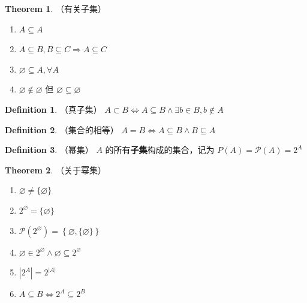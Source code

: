 \documentclass[oneside]{book}
\theoremstyle{definition}
\newtheorem{definition}{Definition}[section]
\newtheorem{theorem}{Theorem}[section]
\begin{document}
		\begin{theorem}
			（有关子集）
			\begin{enumerate}
				\item $A\subseteq A$
				\item $A\subseteq B,B\subseteq C\Rightarrow A\subseteq C$
				\item $\varnothing \subseteq A,\forall A$
				\item $\varnothing\notin\varnothing$ 但 $\varnothing \subseteq\varnothing$
			\end{enumerate}
		\end{theorem}
		
		\begin{definition}
			（真子集）
			$A\subset B\Leftrightarrow A\subseteq B\land\exists b\in B,b\notin A$
		\end{definition}
		
		\begin{definition}
			（集合的相等）
			$A= B\Leftrightarrow A\subseteq B\land B\subseteq A$
		\end{definition}
		
		\begin{definition}
			（幂集）
			$A$ 的所有\textbf{子集}构成的集合，记为 $P(A)=\mathscr P(A)=2^{A}$
		\end{definition}
		
		\begin{theorem}
			（关于幂集）
			\begin{enumerate}
				\item $\varnothing\ne\{\varnothing\}$
				\item $2^\varnothing=\{\varnothing\}$
				\item $\mathscr P\left(2^\varnothing\right)=\left\{\varnothing,\{\varnothing\}\right\}$
				\item $\varnothing\in2^\varnothing\land\varnothing\subseteq2^\varnothing$
				\item $\left|2^A\right|=2^{\left|A\right|}$
				\item $A\subseteq B\Leftrightarrow 2^A\subseteq 2^B$
			\end{enumerate}
		\end{theorem}
		
\end{document}
